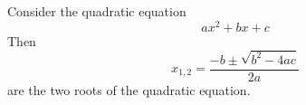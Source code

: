 \documentclass{article}
\begin{document}
  Consider the quadratic equation
  \begin{equation}
    a x^2 + b x + c
  \end{equation}
  Then 
  \begin{equation}
    \label{eq:quad}
    x_{1,2} = \frac{-b\pm\sqrt{b^2-4ac}}{2a}
  \end{equation}
  are the two roots of the quadratic equation.
\end{document}
